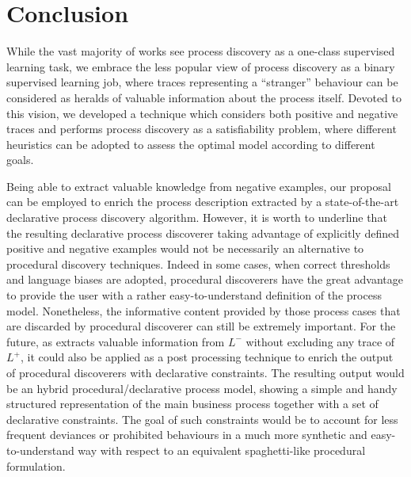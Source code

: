 
\section{Conclusion}
While the vast majority of works see process discovery as a one-class supervised learning task, we embrace the less popular view of process discovery as a binary supervised learning job, where traces representing a ``stranger'' behaviour can be considered as heralds of valuable information about the process itself. Devoted to this vision, we developed a technique which considers both positive and negative traces and performs process discovery as a satisfiability problem, where different heuristics can be adopted to assess the optimal model according to different goals.  

Being able to extract valuable knowledge from negative examples, our proposal \nd can be employed to enrich the process description extracted by a state-of-the-art declarative process discovery algorithm.
However, it is worth to underline that the resulting declarative process discoverer taking advantage of explicitly defined positive and negative examples would not be necessarily an alternative to procedural discovery techniques. 
Indeed in some cases, when correct thresholds and language biases are adopted, procedural discoverers have the great advantage to provide the user with a rather easy-to-understand definition of the process model. Nonetheless, the informative content provided by those process cases that are discarded by procedural discoverer can still be extremely important. 
For the future, as \nd extracts valuable information from $L^-$ without excluding any trace of $L^+$, it could also be applied as a post processing technique to enrich the output of procedural discoverers with declarative constraints.
The resulting output would be an hybrid procedural/declarative process model, showing a simple and handy structured representation of the main business process together with a set of declarative constraints. The goal of such constraints would be to account for less frequent deviances or prohibited behaviours in a much more synthetic and easy-to-understand way with respect to an equivalent spaghetti-like procedural formulation.

